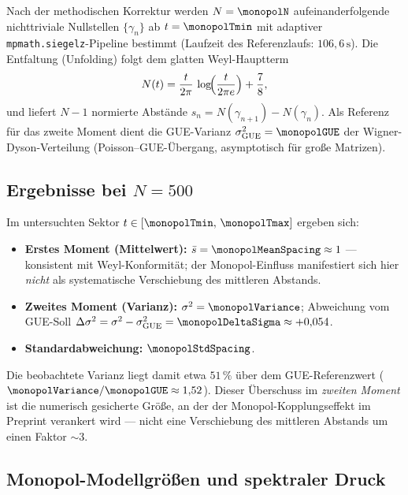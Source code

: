Nach der methodischen Korrektur werden $N=\monopolN$ aufeinanderfolgende nichttriviale
Nullstellen $\{\gamma_n\}$ ab $t=\monopolTmin$ mit adaptiver \texttt{mpmath.siegelz}-Pipeline
bestimmt (Laufzeit des Referenzlaufs: $106{,}6\,\mathrm{s}$).
Die Entfaltung (Unfolding) folgt dem glatten Weyl-Hauptterm
\begin{equation}
  N(t) = \frac{t}{2\pi}\,\log\!\Bigl(\frac{t}{2\pi e}\Bigr) + \frac{7}{8},
  \label{eq:weyl-unfold}
\end{equation}
und liefert $N-1$ normierte Abstände $s_n = N(\gamma_{n+1}) - N(\gamma_n)$.
Als Referenz für das zweite Moment dient die GUE-Varianz
$\sigma^2_{\mathrm{GUE}} = \monopolGUE$ der Wigner-Dyson-Verteilung
(Poisson--GUE-Übergang, asymptotisch für große Matrizen).

\subsection{Ergebnisse bei $N=500$}

Im untersuchten Sektor $t \in [\monopolTmin,\,\monopolTmax]$ ergeben sich:

\begin{itemize}
  \item \textbf{Erstes Moment (Mittelwert):}
        $\bar{s} = \monopolMeanSpacing \approx 1$ --- konsistent mit Weyl-Konformität;
        der Monopol-Einfluss manifestiert sich hier \emph{nicht} als systematische
        Verschiebung des mittleren Abstands.
  \item \textbf{Zweites Moment (Varianz):}
        $\sigma^2 = \monopolVariance$;
        Abweichung vom GUE-Soll
        $\Delta\sigma^2 = \sigma^2 - \sigma^2_{\mathrm{GUE}} = \monopolDeltaSigma
        \approx +0{,}054$.
  \item \textbf{Standardabweichung:}
        $\monopolStdSpacing$.
\end{itemize}

Die beobachtete Varianz liegt damit etwa $51\,\%$ über dem GUE-Referenzwert
($\monopolVariance / \monopolGUE \approx 1{,}52$).
Dieser Überschuss im \emph{zweiten Moment} ist die numerisch gesicherte Größe,
an der der Monopol-Kopplungseffekt im Preprint verankert wird --- nicht eine
Verschiebung des mittleren Abstands um einen Faktor $\sim 3$.

\subsection{Monopol-Modellgrößen und spektraler Druck}

